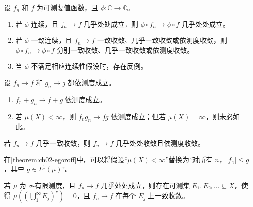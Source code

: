\documentclass[../../main.tex]{subfiles}%
\begin{document}
\begin{exercise}\label{exercise:ch02-composition-convergence}
设 $f_n$ 和 $f$ 为可测复值函数，且 $\phi:\mathbb{C}\to\mathbb{C}$。
\begin{enumerate}
\item\label{item:ch02-composition-ae} 若 $\phi$ 连续，且 $f_n\to f$ 几乎处处成立，则 $\phi\circ f_n\to\phi\circ f$ 几乎处处成立。
\item\label{item:ch02-composition-uniform} 若 $\phi$ 一致连续，且 $f_n\to f$ 一致收敛、几乎一致收敛或依测度收敛，则 $\phi\circ f_n\to\phi\circ f$ 分别一致收敛、几乎一致收敛或依测度收敛。
\item\label{item:ch02-composition-counterexamples} 当 $\phi$ 不满足相应连续性假设时，存在反例。
\end{enumerate}
\end{exercise}
\begin{exercise}\label{exercise:ch02-measure-algebra}
设 $f_n\to f$ 和 $g_n\to g$ 都依测度成立。
\begin{enumerate}
\item\label{item:ch02-measure-sums} $f_n+g_n\to f+g$ 依测度成立。
\item\label{item:ch02-measure-products} 若 $\mu(X)<\infty$，则 $f_ng_n\to fg$ 依测度成立；但若 $\mu(X)=\infty$，则未必如此。
\end{enumerate}
\end{exercise}
\begin{exercise}\label{exercise:ch02-almost-uniform-implications}
若 $f_n\to f$ 几乎一致收敛，则 $f_n\to f$ 几乎处处收敛且依测度收敛。
\end{exercise}
\begin{exercise}\label{exercise:ch02-egoroff-dominated}
在\cref{theorem:ch02-egoroff}中，可以将假设“$\mu(X)<\infty$”替换为“对所有 $n$，$|f_n|\le g$，其中 $g\in L^1(\mu)$”。
\end{exercise}
\begin{exercise}\label{exercise:ch02-sigma-finite-uniform-pieces}
若 $\mu$ 为 $\sigma$-有限测度，且 $f_n\to f$ 几乎处处成立，则存在可测集 $E_1,E_2,\ldots\subseteq X$，使得 $\mu((\bigcup_1^\infty E_j)^c)=0$，且 $f_n\to f$ 在每个 $E_j$ 上一致收敛。
\end{exercise}
\end{document}

